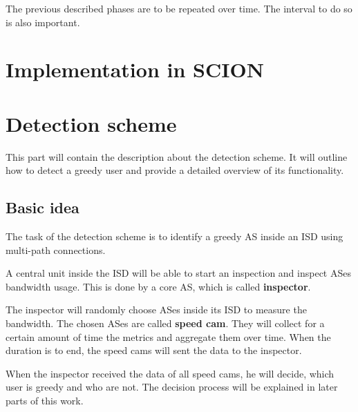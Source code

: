 \documentclass[thesis.tex]{subfiles}
\begin{document}
The previous described phases are to be repeated over time. The interval to do so is also important. 

\section{Implementation in SCION} \label{sec:main:scionimpl}

\section{Detection scheme}
This part will contain the description about the detection scheme. It will outline how to detect a greedy user and provide a detailed overview of its functionality.

\subsection{Basic idea}
The task of the detection scheme is to identify a greedy AS inside an ISD using multi-path connections. 

A central unit inside the ISD will be able to start an inspection and inspect ASes bandwidth usage. This is done by a core AS, which is called \textbf{inspector}. 

The inspector will randomly choose ASes inside its ISD to measure the bandwidth. The chosen ASes are called \textbf{speed cam}. They will collect for a certain amount of time the metrics and aggregate them over time. When the duration is to end, the speed cams will sent the data to the inspector.

When the inspector received the data of all speed cams, he will decide, which user is greedy and who are not. The decision process will be explained in later parts of this work.
\end{document}
